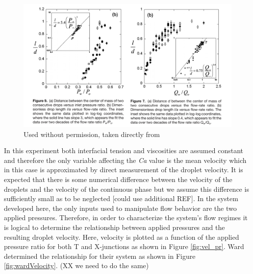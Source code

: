 \begin{figure}[h]
\centering 
\includegraphics[width=01.0\columnwidth]{pvq.PNG} 
\caption[Droplet Length as a Function of Applied Control Pressure Ratio]{Used without permission, taken directly from \cite{Ward2005} }
\label{fig:pvq} 
\end{figure}

In this experiment both interfacial tension and viscosities are assumed constant and therefore the only variable affecting the \emph{Ca} value is the mean velocity which in this case is approximated by direct measurement of the droplet velocity. It is expected that there is some numerical difference between the velocity of the droplets and the velocity of the continuous phase but we assume this difference is sufficiently small as to be neglected\cite{Ward2005} [could use additional  REF]. In the system developed here, the only inputs used to manipulate flow behavior are the two applied pressures. Therefore, in order to characterize the system's flow regimes it is logical to determine the relationship between applied pressures and the resulting droplet velocity. Here, velocity is plotted as a function of the applied pressure ratio for both T and X-junctions as shown in Figure \vref{fig:vel_pr}.  Ward determined the relationship for their system as shown in Figure \vref{fig:wardVelocity}. (XX we need to do the same)

